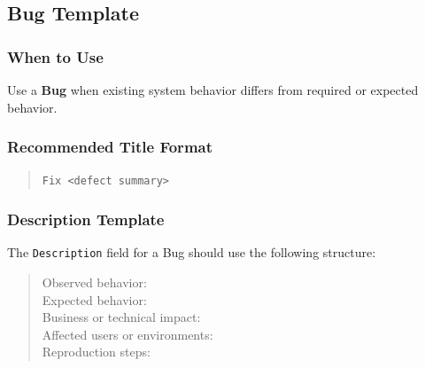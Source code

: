 \documentclass[11pt,a4paper]{article}
\begin{document}
\subsection{Bug Template}

\subsubsection*{When to Use}
Use a \textbf{Bug} when existing system behavior differs from required or expected behavior.

\subsubsection*{Recommended Title Format}
\begin{quote}
\texttt{Fix <defect summary>}
\end{quote}

\subsubsection*{Description Template}
The \texttt{Description} field for a Bug should use the following structure:
\begin{quote}
Observed behavior: \\
Expected behavior: \\
Business or technical impact: \\
Affected users or environments: \\
Reproduction steps:
\end{quote}
\end{document}

